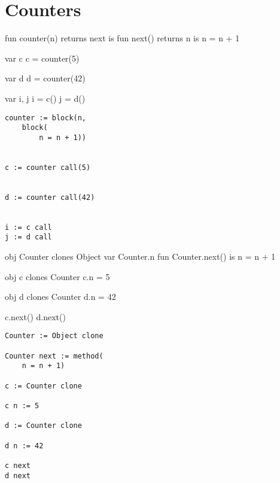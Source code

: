 \newpage
\section{Counters}

\begin{minipage}{0.5\textwidth}
\begin{program}
fun counter(n) returns next is
    fun next() returns n is
        n = n + 1

var c
c = counter(5)

var d
d = counter(42)

var i, j
i = c()
j = d()
\end{program}
\end{minipage}
\begin{minipage}{0.5\textwidth}
\begin{lstlisting}[language=io]
counter := block(n,
    block(
        n = n + 1))


c := counter call(5)


d := counter call(42)


i := c call
j := d call
\end{lstlisting}
\end{minipage}

\begin{minipage}{0.5\textwidth}
\begin{program}
obj Counter clones Object
var Counter.n
fun Counter.next() is
    n = n + 1

obj c clones Counter
c.n = 5

obj d clones Counter
d.n = 42


c.next()
d.next()
\end{program}
\end{minipage}
\begin{minipage}{0.5\textwidth}
\begin{lstlisting}[language=io]
Counter := Object clone

Counter next := method(
    n = n + 1)

c := Counter clone

c n := 5

d := Counter clone

d n := 42

c next
d next
\end{lstlisting}
\end{minipage}


